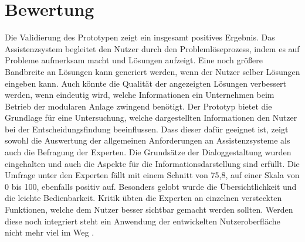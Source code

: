 \section{Bewertung}
Die Validierung des Prototypen zeigt ein insgesamt positives Ergebnis. Das Assistenzsystem begleitet den Nutzer durch den Problemlöseprozess, indem es auf Probleme aufmerksam macht und Lösungen aufzeigt. Eine noch größere Bandbreite an Lösungen kann generiert werden, wenn der Nutzer selber Lösungen eingeben kann. Auch könnte die Qualität der angezeigten Lösungen verbessert werden, wenn eindeutig wird, welche Informationen ein Unternehmen beim Betrieb der modularen Anlage zwingend benötigt. Der Prototyp bietet die Grundlage für eine Untersuchung, welche dargestellten Informationen den Nutzer bei der Entscheidungsfindung beeinflussen. Dass dieser dafür geeignet ist, zeigt sowohl die Auswertung der allgemeinen Anforderungen an Assistenzsysteme als auch die Befragung der Experten. Die Grundsätze der Dialoggestaltung wurden eingehalten und auch die Aspekte für die Informationsdarstellung sind erfüllt. Die Umfrage unter den Experten fällt mit einem Schnitt von 75,8, auf einer Skala von 0 bis 100, ebenfalls positiv auf. Besonders gelobt wurde die Übersichtlichkeit und die leichte Bedienbarkeit. Kritik übten die Experten an einzelnen versteckten Funktionen, welche dem Nutzer besser sichtbar gemacht werden sollten. Werden diese noch integriert steht ein Anwendung der entwickelten Nutzeroberfläche nicht mehr viel im Weg .

